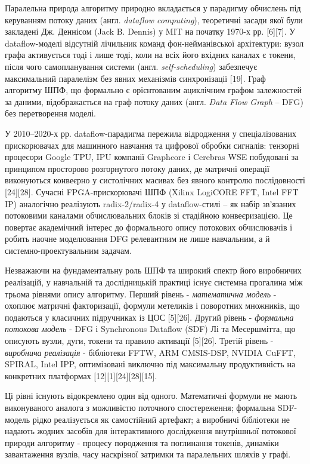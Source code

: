 \documentclass[
]{article}
\begin{document}
Паралельна природа алгоритму природно вкладається у парадигму обчислень
під керуванням потоку даних (англ. \emph{dataflow computing}),
теоретичні засади якої були закладені Дж. Деннісом (Jack B. Dennis) у
MIT на початку 1970-х рр. {[}6{]}{[}7{]}. У dataflow-моделі відсутній
лічильник команд фон-нейманівської архітектури: вузол графа активується
тоді і лише тоді, коли на всіх його вхідних каналах є токени, після чого
самопланування системи (англ. \emph{self-scheduling}) забезпечує
максимальний паралелізм без явних механізмів синхронізації {[}19{]}.
Граф алгоритму ШПФ, що формально є орієнтованим ациклічним графом
залежностей за даними, відображається на граф потоку даних (англ.
\emph{Data Flow Graph} -- DFG) без перетворення моделі.

У 2010--2020-х рр. dataflow-парадигма пережила відродження у
спеціалізованих прискорювачах для машинного навчання та цифрової
обробки сигналів: тензорні процесори Google TPU, IPU компанії
Graphcore і Cerebras WSE побудовані за принципом просторово
розгорнутого потоку даних, де матричні операції виконуються
конвеєрно у систолічних масивах без явного контролю послідовності
{[}24{]}{[}28{]}. Сучасні FPGA-прискорювачі ШПФ (Xilinx LogiCORE FFT,
Intel FFT IP) аналогічно реалізують radix-2/radix-4 у dataflow-стилі
-- як набір зв'язаних потоковими каналами обчислювальних блоків зі
стадійною конвеєризацією. Це повертає академічний інтерес до
формального опису потокових обчислювачів і робить наочне моделювання
DFG релевантним не лише навчальним, а й системно-проектувальним
задачам.

Незважаючи на фундаментальну роль ШПФ та широкий спектр його виробничих
реалізацій, у навчальній та дослідницькій практиці існує системна
прогалина між трьома рівнями опису алгоритму. Перший рівень -
\emph{математична модель} - охоплює матричні факторизації, формули
метеликів і поворотних множників, що подаються у класичних підручниках
із ЦОС {[}5{]}{[}26{]}. Другий рівень - \emph{формальна потокова модель}
- DFG і Synchronous Dataflow (SDF) Лі та Месершмітта, що описують вузли,
дуги, токени та правило активації {[}5{]}{[}26{]}. Третій рівень -
\emph{виробнича реалізація} - бібліотеки FFTW, ARM CMSIS-DSP, NVIDIA
CuFFT, SPIRAL, Intel IPP, оптимізовані виключно під максимальну
продуктивність на конкретних платформах
{[}12{]}{[}1{]}{[}24{]}{[}28{]}{[}15{]}.

Ці рівні існують відокремлено один від одного. Математичні формули не
мають виконуваного аналога з можливістю поточного спостереження;
формальна SDF-модель рідко реалізується як самостійний артефакт; а
виробничі бібліотеки не надають жодних засобів для інтерактивного
дослідження внутрішньої потокової природи алгоритму - процесу породження
та поглинання токенів, динаміки завантаження вузлів, часу наскрізної
затримки та паралельних шляхів у графі.
\end{document}
